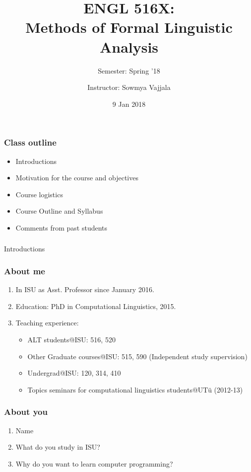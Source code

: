 \documentclass{beamer}
\author[Sowmya Vajjala]{Instructor: Sowmya Vajjala}
\title[ENGL 516X]{ENGL 516X: \\ Methods of Formal Linguistic Analysis}
\subtitle{Semester: Spring '18}
\date{9 Jan 2018}
\institute{Iowa State University, USA}
\begin{document}
\begin{frame}\titlepage
\end{frame}

\begin{frame}
\frametitle{Class outline}
\begin{itemize}
\item Introductions
\item Motivation for the course and objectives
\item Course logistics
\item Course Outline and Syllabus 
\item Comments from past students
\end{itemize}
\end{frame}

\begin{frame}
\frametitle{}
\begin{center}
\Large Introductions
\end{center}
\end{frame}

\begin{frame}
\frametitle{About me}
\begin{enumerate}
\item In ISU as Asst. Professor since January 2016.
\item Education: PhD in Computational Linguistics, 2015.
\item Teaching experience:
\begin{itemize}
\item ALT students@ISU: 516, 520
\item Other Graduate courses@ISU: 515, 590 (Independent study supervision)
\item Undergrad@ISU: 120, 314, 410
\item Topics seminars for computational linguistics students@UT\"u (2012-13)
\end{itemize}
\end{enumerate}
\end{frame}

\begin{frame}
\frametitle{About you}
\begin{enumerate}
\item Name
\item What do you study in ISU?
\item Why do you want to learn computer programming?
\end{enumerate}
\end{frame}
\end{document}
